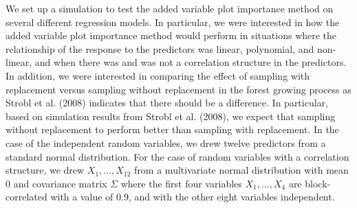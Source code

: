 \documentclass[12pt,twoside]{reedthesis}
\theoremstyle{definition}
\theoremstyle{definition}
\theoremstyle{definition}
\theoremstyle{remark}
\begin{document}
We set up a simulation to test the added variable plot importance method
on several different regression models. In particular, we were
interested in how the added variable plot importance method would
perform in situations where the relationship of the response to the
predictors was linear, polynomial, and non-linear, and when there was
and was not a correlation structure in the predictors. In addition, we
were interested in comparing the effect of sampling with replacement
versus sampling without replacement in the forest growing process as
Strobl et al. (2008) indicates that there should be a difference. In
particular, based on simulation results from Strobl et al. (2008), we
expect that sampling without replacement to perform better than sampling
with replacement. In the case of the independent random variables, we
drew twelve predictors from a standard normal distribution. For the case
of random variables with a correlation structure, we drew
\(X_1,\ldots,X_{12}\) from a multivariate normal distribution with mean
0 and covariance matrix \(\Sigma\) where the first four variables
\(X_1,\ldots,X_4\) are block-correlated with a value of 0.9, and with
the other eight variables independent. \par 
\begin{table}

\caption{\label{tab:kable}Covariance Matrix for Correlated Predictors}
\centering
{}
\end{table}
\end{document}
